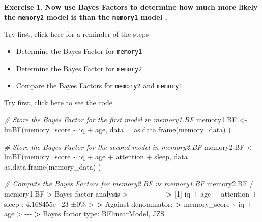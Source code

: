 \documentclass[
]{book}
\newenvironment{Shaded}{\begin{snugshade}}{\end{snugshade}}
\newcommand{\AttributeTok}[1]{\textcolor[rgb]{0.77,0.63,0.00}{#1}}
\newcommand{\CommentTok}[1]{\textcolor[rgb]{0.56,0.35,0.01}{\textit{#1}}}
\newcommand{\DecValTok}[1]{\textcolor[rgb]{0.00,0.00,0.81}{#1}}
\newcommand{\ErrorTok}[1]{\textcolor[rgb]{0.64,0.00,0.00}{\textbf{#1}}}
\newcommand{\FloatTok}[1]{\textcolor[rgb]{0.00,0.00,0.81}{#1}}
\newcommand{\FunctionTok}[1]{\textcolor[rgb]{0.00,0.00,0.00}{#1}}
\newcommand{\NormalTok}[1]{#1}
\newcommand{\OtherTok}[1]{\textcolor[rgb]{0.56,0.35,0.01}{#1}}
\newcommand{\SpecialCharTok}[1]{\textcolor[rgb]{0.00,0.00,0.00}{#1}}
\theoremstyle{definition}
\theoremstyle{definition}
\theoremstyle{definition}
\newtheorem{exercise}{Exercise}[chapter]
\theoremstyle{definition}
\theoremstyle{remark}
\begin{document}
\begin{exercise}
\hfill\break
\hfill\break
\textbf{Now use Bayes Factors to determine how much more likely the \texttt{memory2} model is than the \texttt{memory1} model .}

\hfill\break

Try first, click here for a reminder of the steps

\begin{itemize}
\item
  Determine the Bayes Factor for \texttt{memory1}
\item
  Determine the Bayes Factor for \texttt{memory2}
\item
  Compare the Bayes Factors for \texttt{memory2} and \texttt{memory1}
\end{itemize}

\hfill\break

Try first, click here to see the code

\begin{Shaded}
\begin{Highlighting}[]
\CommentTok{\# Store the Bayes Factor for the first model in memory1.BF}
\NormalTok{memory1.BF }\OtherTok{\textless{}{-}} \FunctionTok{lmBF}\NormalTok{(memory\_score }\SpecialCharTok{\textasciitilde{}}\NormalTok{ iq }\SpecialCharTok{+}\NormalTok{ age, }\AttributeTok{data =} \FunctionTok{as.data.frame}\NormalTok{(memory\_data) )}

\CommentTok{\# Store the Bayes Factor for the second model in memory2.BF}
\NormalTok{memory2.BF }\OtherTok{\textless{}{-}} \FunctionTok{lmBF}\NormalTok{(memory\_score }\SpecialCharTok{\textasciitilde{}}\NormalTok{ iq }\SpecialCharTok{+}\NormalTok{ age }\SpecialCharTok{+}\NormalTok{ attention }\SpecialCharTok{+}\NormalTok{ sleep, }\AttributeTok{data =} \FunctionTok{as.data.frame}\NormalTok{(memory\_data) )}

\CommentTok{\# Compute the Bayes Factors for memory2.BF vs memory1.BF}
\NormalTok{memory2.BF }\SpecialCharTok{/}\NormalTok{ memory1.BF}
\SpecialCharTok{\textgreater{}}\NormalTok{ Bayes factor analysis}
\SpecialCharTok{\textgreater{}} \SpecialCharTok{{-}{-}{-}{-}{-}{-}{-}{-}{-}{-}{-}{-}{-}{-}}
\ErrorTok{\textgreater{}}\NormalTok{ [}\DecValTok{1}\NormalTok{] iq }\SpecialCharTok{+}\NormalTok{ age }\SpecialCharTok{+}\NormalTok{ attention }\SpecialCharTok{+}\NormalTok{ sleep }\SpecialCharTok{:} \FloatTok{4.168455e+23}\NormalTok{ ±}\DecValTok{0}\NormalTok{\%}
\SpecialCharTok{\textgreater{}} 
\ErrorTok{\textgreater{}}\NormalTok{ Against denominator}\SpecialCharTok{:}
\ErrorTok{\textgreater{}}\NormalTok{   memory\_score }\SpecialCharTok{\textasciitilde{}}\NormalTok{ iq }\SpecialCharTok{+}\NormalTok{ age }
\SpecialCharTok{\textgreater{}} \SpecialCharTok{{-}{-}{-}}
\ErrorTok{\textgreater{}}\NormalTok{ Bayes factor type}\SpecialCharTok{:}\NormalTok{ BFlinearModel, JZS}
\end{Highlighting}
\end{Shaded}


\end{exercise}
\end{document}

